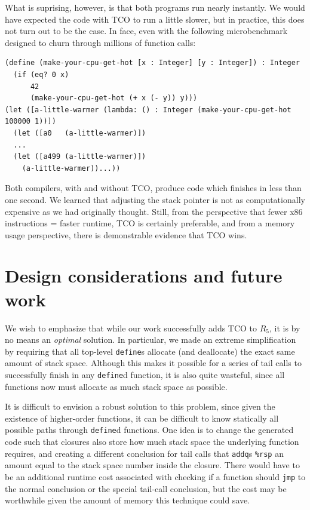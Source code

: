 \documentclass[12pt]{article}
\begin{document}
What is suprising, however, is that both programs run nearly instantly. We would
have expected the code with TCO to run a little slower, but in practice, this
does not turn out to be the case. In face, even with the following microbenchmark
designed to churn through millions of function calls:

\begin{verbatim}
(define (make-your-cpu-get-hot [x : Integer] [y : Integer]) : Integer
  (if (eq? 0 x)
      42
      (make-your-cpu-get-hot (+ x (- y)) y)))
(let ([a-little-warmer (lambda: () : Integer (make-your-cpu-get-hot 100000 1))])
  (let ([a0   (a-little-warmer)])
  ...
  (let ([a499 (a-little-warmer)])
    (a-little-warmer))...))
\end{verbatim}

Both compilers, with and without TCO, produce code which finishes in less than one
second. We learned that adjusting the stack pointer is not as computationally
expensive as we had originally thought. Still, from the perspective that fewer
x86 instructions = faster runtime, TCO is certainly preferable, and from a
memory usage perspective, there is demonstrable evidence that TCO wins.

\section{Design considerations and future work}

We wish to emphasize that while our work successfully adds TCO to $R_5$, it is by
no means an \textit{optimal} solution. In particular, we made an extreme simplification
by requiring that all top-level \verb+define+s allocate (and deallocate) the exact
same amount of stack space. Although this makes it possible for a series of tail calls
to successfully finish in any \verb+define+d function, it is also quite wasteful, since
all functions now must allocate as much stack space as possible.

It is difficult to envision a robust solution to this problem, since given the existence
of higher-order functions, it can be difficult to know statically all possible paths
through \verb+define+d functions. One idea is to change the generated code such that
closures also store how much stack space the underlying function requires, and creating
a different conclusion for tail calls that \verb+addq+s \verb+%rsp+ an amount equal
to the stack space number inside the closure. There would have to be an additional
runtime cost associated with checking if a function should \verb+jmp+ to the normal
conclusion or the special tail-call conclusion, but the cost may be worthwhile
given the amount of memory this technique could save.
\end{document}

